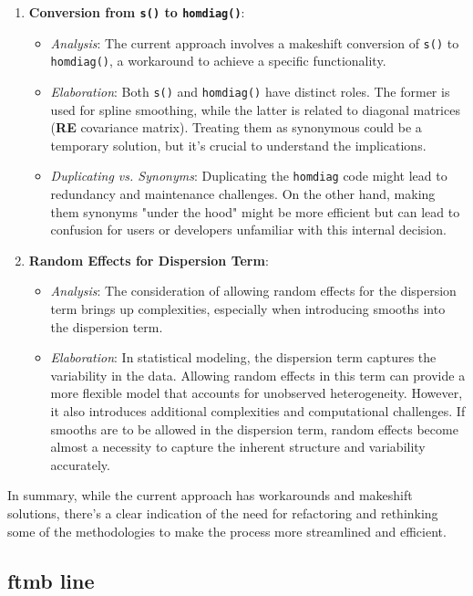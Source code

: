 \begin{enumerate}
    \item \textbf{Conversion from \texttt{s()} to \texttt{homdiag()}}:
    \begin{itemize}
        \item \textit{Analysis}: The current approach involves a makeshift conversion of \texttt{s()} to \texttt{homdiag()}, a workaround to achieve a specific functionality.
        \item \textit{Elaboration}: Both \texttt{s()} and \texttt{homdiag()} have distinct roles. The former is used for spline smoothing, while the latter  is related to diagonal matrices (\textbf{RE} covariance matrix). Treating them as synonymous could be a temporary solution, but it's crucial to understand the implications.
        \item \textit{Duplicating vs. Synonyms}: Duplicating the \texttt{homdiag} code might lead to redundancy and maintenance challenges. On the other hand, making them synonyms "under the hood" might be more efficient but can lead to confusion for users or developers unfamiliar with this internal decision.
    \end{itemize}

    \item \textbf{Random Effects for Dispersion Term}:
    \begin{itemize}
        \item \textit{Analysis}: The consideration of allowing random effects for the dispersion term brings up complexities, especially when introducing smooths into the dispersion term.
        \item \textit{Elaboration}: In statistical modeling, the dispersion term captures the variability in the data. Allowing random effects in this term can provide a more flexible model that accounts for unobserved heterogeneity. However, it also introduces additional complexities and computational challenges. If smooths are to be allowed in the dispersion term, random effects become almost a necessity to capture the inherent structure and variability accurately.
    \end{itemize}
\end{enumerate}

In summary, while the current approach has workarounds and makeshift solutions, there's a clear indication of the need for refactoring and rethinking some of the methodologies to make the process more streamlined and efficient.

\subsection{ftmb line}


